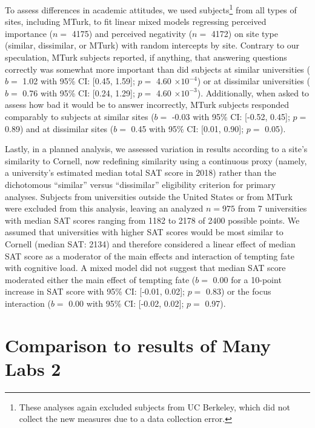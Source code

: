 \documentclass[english,floatsintext,man]{apa6}
\theoremstyle{definition}
\theoremstyle{definition}
\theoremstyle{definition}
\theoremstyle{remark}
\begin{document}
To assess differences in academic attitudes, we used subjects\footnote{These
  analyses again excluded subjects from UC Berkeley, which did not
  collect the new measures due to a data collection error.} from all
types of sites, including MTurk, to fit linear mixed models regressing
perceived importance (\(n=\) 4175) and perceived negativity (\(n=\)
4172) on site type (similar, dissimilar, or MTurk) with random
intercepts by site. Contrary to our speculation, MTurk subjects
reported, if anything, that answering questions correctly was somewhat
more important than did subjects at similar universities (\(b=\) 1.02
with 95\% CI: {[}0.45, 1.59{]}; \(p=\) 4.60 \(\times 10^{-4}\)) or at
dissimilar universities (\(b=\) 0.76 with 95\% CI: {[}0.24, 1.29{]};
\(p=\) 4.60 \(\times 10^{-3}\)). Additionally, when asked to assess how
bad it would be to answer incorrectly, MTurk subjects responded
comparably to subjects at similar sites (\(b=\) -0.03 with 95\% CI:
{[}-0.52, 0.45{]}; \(p=\) 0.89) and at dissimilar sites (\(b=\) 0.45
with 95\% CI: {[}0.01, 0.90{]}; \(p=\) 0.05).

Lastly, in a planned analysis, we assessed variation in results
according to a site's similarity to Cornell, now redefining similarity
using a continuous proxy (namely, a university's estimated median total
SAT score in 2018) rather than the dichotomous \enquote{similar} versus
\enquote{dissimilar} eligibility criterion for primary analyses.
Subjects from universities outside the United States or from MTurk were
excluded from this analysis, leaving an analyzed \(n = 975\) from 7
universities with median SAT scores ranging from 1182 to 2178 of 2400
possible points. We assumed that universities with higher SAT scores
would be most similar to Cornell (median SAT: 2134) and therefore
considered a linear effect of median SAT score as a moderator of the
main effects and interaction of tempting fate with cognitive load. A
mixed model did not suggest that median SAT score moderated either the
main effect of tempting fate (\(b=\) 0.00 for a 10-point increase in SAT
score with 95\% CI: {[}-0.01, 0.02{]}; \(p=\) 0.83) or the focus
interaction (\(b=\) 0.00 with 95\% CI: {[}-0.02, 0.02{]}; \(p=\) 0.97).

\section{Comparison to results of Many Labs
2}\label{comparison-to-results-of-many-labs-2}
\end{document}
